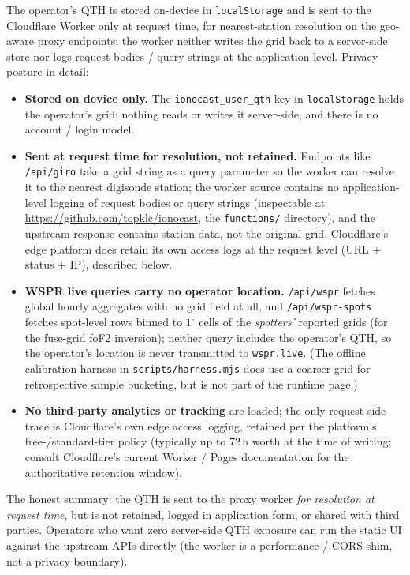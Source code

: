 \documentclass[11pt,a4paper]{article}
\newcommand{\degree}{\ensuremath{{}^\circ}}
\begin{document}
The operator's QTH is stored on-device in \texttt{localStorage}
and is sent to the Cloudflare Worker only at request time, for
nearest-station resolution on the geo-aware proxy endpoints; the
worker neither writes the grid back to a server-side store nor
logs request bodies / query strings at the application level.
Privacy posture in detail:
\begin{itemize}[nosep]
  \item \textbf{Stored on device only.}  The
        \texttt{ionocast\_user\_qth} key in \texttt{localStorage} holds
        the operator's grid; nothing reads or writes it
        server-side, and there is no account / login model.
  \item \textbf{Sent at request time for resolution, not retained.}
        Endpoints like \texttt{/api/giro} take a grid string as a
        query parameter so the worker can resolve it to the
        nearest digisonde station; the worker source contains no
        application-level logging of request bodies or query
        strings (inspectable at
        \url{https://github.com/topklc/ionocast}, the
        \texttt{functions/} directory), and the upstream
        response contains station data, not the original grid.
        Cloudflare's edge platform does retain its own access
        logs at the request level (URL + status + IP), described
        below.
  \item \textbf{WSPR live queries carry no operator location.}
        \texttt{/api/wspr} fetches global hourly aggregates with
        no grid field at all, and \texttt{/api/wspr-spots} fetches
        spot-level rows binned to $1\degree$ cells of the
        \emph{spotters'} reported grids (for the fuse-grid foF2
        inversion); neither query includes the operator's QTH, so
        the operator's location is never transmitted to
        \texttt{wspr.live}.  (The offline
        calibration harness in \texttt{scripts/harness.mjs}
        does use a coarser grid for retrospective sample
        bucketing, but is not part of the runtime page.)
  \item \textbf{No third-party analytics or tracking} are
        loaded; the only request-side trace is Cloudflare's
        own edge access logging, retained per the platform's
        free-/standard-tier policy (typically up to 72\,h
        worth at the time of writing; consult Cloudflare's
        current Worker / Pages documentation for the
        authoritative retention window).
\end{itemize}
The honest summary: the QTH is sent to the proxy worker
\emph{for resolution at request time}, but is not retained,
logged in application form, or shared with third parties.
Operators who want zero server-side QTH exposure can run the
static UI against the upstream APIs directly (the worker is a
performance / CORS shim, not a privacy boundary).
\end{document}
